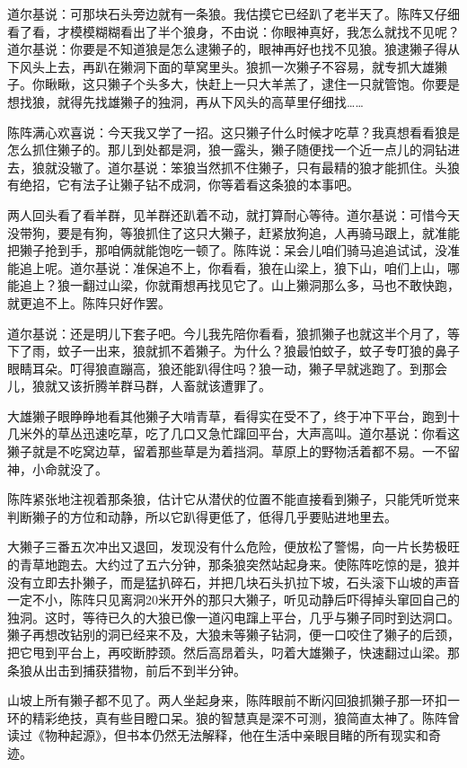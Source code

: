 \par 道尔基说：可那块石头旁边就有一条狼。我估摸它已经趴了老半天了。陈阵又仔细看了看，才模模糊糊看出了半个狼身，不由说：你眼神真好，我怎么就找不见呢？道尔基说：你要是不知道狼是怎么逮獭子的，眼神再好也找不见狼。狼逮獭子得从下风头上去，再趴在獭洞下面的草窝里头。狼抓一次獭子不容易，就专抓大雄獭子。你瞅瞅，这只獭子个头多大，快赶上一只大羊羔了，逮住一只就管饱。你要是想找狼，就得先找雄獭子的独洞，再从下风头的高草里仔细找……
\par 陈阵满心欢喜说：今天我又学了一招。这只獭子什么时候才吃草？我真想看看狼是怎么抓住獭子的。那儿到处都是洞，狼一露头，獭子随便找一个近一点儿的洞钻进去，狼就没辙了。道尔基说：笨狼当然抓不住獭子，只有最精的狼才能抓住。头狼有绝招，它有法子让獭子钻不成洞，你等着看这条狼的本事吧。
\par 两人回头看了看羊群，见羊群还趴着不动，就打算耐心等待。道尔基说：可惜今天没带狗，要是有狗，等狼抓住了这只大獭子，赶紧放狗追，人再骑马跟上，就准能把獭子抢到手，那咱俩就能饱吃一顿了。陈阵说：呆会儿咱们骑马追追试试，没准能追上呢。道尔基说：准保追不上，你看看，狼在山梁上，狼下山，咱们上山，哪能追上？狼一翻过山梁，你就甭想再找见它了。山上獭洞那么多，马也不敢快跑，就更追不上。陈阵只好作罢。
\par 道尔基说：还是明儿下套子吧。今儿我先陪你看看，狼抓獭子也就这半个月了，等下了雨，蚊子一出来，狼就抓不着獭子。为什么？狼最怕蚊子，蚊子专叮狼的鼻子眼睛耳朵。叮得狼直蹦高，狼还能趴得住吗？狼一动，獭子早就逃跑了。到那会儿，狼就又该折腾羊群马群，人畜就该遭罪了。
\par 大雄獭子眼睁睁地看其他獭子大啃青草，看得实在受不了，终于冲下平台，跑到十几米外的草丛迅速吃草，吃了几口又急忙蹿回平台，大声高叫。道尔基说：你看这獭子就是不吃窝边草，留着那些草是为着挡洞。草原上的野物活着都不易。一不留神，小命就没了。
\par 陈阵紧张地注视着那条狼，估计它从潜伏的位置不能直接看到獭子，只能凭听觉来判断獭子的方位和动静，所以它趴得更低了，低得几乎要贴进地里去。
\par 大獭子三番五次冲出又退回，发现没有什么危险，便放松了警惕，向一片长势极旺的青草地跑去。大约过了五六分钟，那条狼突然站起身来。使陈阵吃惊的是，狼并没有立即去扑獭子，而是猛扒碎石，并把几块石头扒拉下坡，石头滚下山坡的声音一定不小，陈阵只见离洞20米开外的那只大獭子，听见动静后吓得掉头窜回自己的独洞。这时，等待已久的大狼已像一道闪电蹿上平台，几乎与獭子同时到达洞口。獭子再想改钻别的洞已经来不及，大狼未等獭子钻洞，便一口咬住了獭子的后颈，把它甩到平台上，再咬断脖颈。然后高昂着头，叼着大雄獭子，快速翻过山梁。那条狼从出击到捕获猎物，前后不到半分钟。
\par 山坡上所有獭子都不见了。两人坐起身来，陈阵眼前不断闪回狼抓獭子那一环扣一环的精彩绝技，真有些目瞪口呆。狼的智慧真是深不可测，狼简直太神了。陈阵曾读过《物种起源》，但书本仍然无法解释，他在生活中亲眼目睹的所有现实和奇迹。
